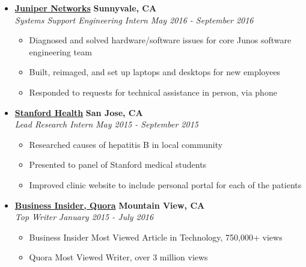 \documentclass[10pt,letterpaper]{article}
\begin{document}
\begin{itemize}
    \item[]
    {\href{http://www.twitter.com}{\textbf{Juniper Networks}} \hfill
      \textbf{Sunnyvale, CA}}
    \\
    {\emph{Systems Support Engineering Intern} \hfill \emph{May 2016 - September 2016}}

    \begin{itemize}[label=\textbullet]
      \itemsep0em
      \item Diagnosed and solved hardware/software issues for core Junos software engineering team
      \item Built, reimaged, and set up laptops and desktops for new employees
      \item Responded to requests for technical assistance in person, via phone
    \end{itemize}

    \item[]
    {\href{http://www.disqus.com}{\textbf{Stanford Health}} \hfill
      \textbf{San Jose, CA}}
    \\
    {\emph{Lead Research Intern} \hfill \emph{May 2015 - September 2015}}

    \begin{itemize}[label=\textbullet]
      \itemsep0em
      \item Researched causes of hepatitis B in local community
      \item Presented to panel of Stanford medical students
      \item Improved clinic website to include personal portal for each of the patients
    \end{itemize}


    \item[]
    {\href{http://www.twg.ca}{\textbf{Business Insider, Quora}} \hfill
      \textbf{Mountain View, CA}}
    \\
    {\emph{Top Writer} \hfill \emph{January 2015 - July 2016}}

    \begin{itemize}[label=\textbullet]
      \itemsep0em
      \item Business Insider Most Viewed Article in Technology, 750,000+ views
      \item Quora Most Viewed Writer, over 3 million views
    \end{itemize}
  \end{itemize}


\end{document}
